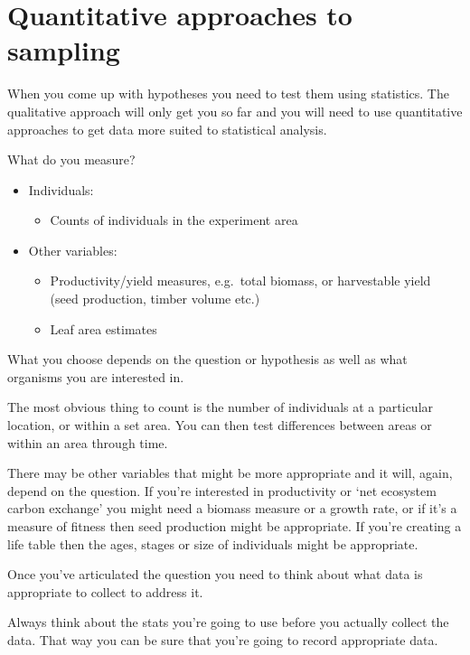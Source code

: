 \documentclass[
  letterpaper,
  DIV=11,
  numbers=noendperiod]{scrreprt}
\providecommand{\tightlist}{%
  \setlength{\itemsep}{0pt}\setlength{\parskip}{0pt}}
\begin{document}
\section{Quantitative approaches to
sampling}\label{quantitative-approaches-to-sampling}

When you come up with hypotheses you need to test them using statistics.
The qualitative approach will only get you so far and you will need to
use quantitative approaches to get data more suited to statistical
analysis.

What do you measure?

\begin{itemize}
\tightlist
\item
  Individuals:

  \begin{itemize}
  \tightlist
  \item
    Counts of individuals in the experiment area
  \end{itemize}
\item
  Other variables:

  \begin{itemize}
  \item
    Productivity/yield measures, e.g.~total biomass, or harvestable
    yield (seed production, timber volume etc.)
  \item
    Leaf area estimates
  \end{itemize}
\end{itemize}

What you choose depends on the question or hypothesis as well as what
organisms you are interested in.

The most obvious thing to count is the number of individuals at a
particular location, or within a set area. You can then test differences
between areas or within an area through time.

There may be other variables that might be more appropriate and it will,
again, depend on the question. If you're interested in productivity or
`net ecosystem carbon exchange' you might need a biomass measure or a
growth rate, or if it's a measure of fitness then seed production might
be appropriate. If you're creating a life table then the ages, stages or
size of individuals might be appropriate.

Once you've articulated the question you need to think about what data
is appropriate to collect to address it.

Always think about the stats you're going to use before you actually
collect the data. That way you can be sure that you're going to record
appropriate data.
\end{document}

